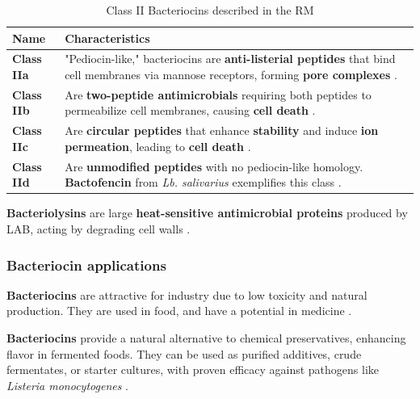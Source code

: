 \begin{table}[h]
    \centering
    \caption{Class II Bacteriocins described in the RM}
    \label{tab:L10-ClassII}
    \begin{tabular}{m{3cm}|p{10cm}} 
        \textbf{Name} & \textbf{Characteristics} \\
        \hline
        \vspace{0.5em}
        \textbf{Class IIa} & "Pediocin-like," bacteriocins are \textbf{anti-listerial peptides} that bind cell membranes via mannose receptors, forming \textbf{pore complexes} \cite*{L10-MicroFunct}. \\

        \vspace{0.5em}
        \textbf{Class IIb} &  Are \textbf{two-peptide antimicrobials} requiring both peptides to permeabilize cell membranes, causing \textbf{cell death} \cite*{L10-MicroFunct}. \\

        \vspace{0.5em}
        \textbf{Class IIc} & Are \textbf{circular peptides} that enhance \textbf{stability} and induce \textbf{ion permeation}, leading to \textbf{cell death} \cite*{L10-MicroFunct}. \\

        \vspace{0.5em}
        \textbf{Class IId} & Are \textbf{unmodified peptides} with no pediocin-like homology. \textbf{Bactofencin} from \textit{Lb. salivarius} exemplifies this class \cite*{L10-MicroFunct}. \\
    \end{tabular}
\end{table}

\textbf{Bacteriolysins} are large \textbf{heat-sensitive antimicrobial proteins} produced by LAB, acting by degrading cell walls \cite*{L10-MicroFunct}.

\subsubsection*{Bacteriocin applications}
\textbf{Bacteriocins} are attractive for industry due to low toxicity and natural production. They are used in food, and have a potential in medicine \cite*{L10-MicroFunct}.

\textbf{Bacteriocins} provide a natural alternative to chemical preservatives, enhancing flavor in fermented foods. They can be used as purified additives, crude fermentates, or starter cultures, with proven efficacy against pathogens like \textit{Listeria monocytogenes} \cite*{L10-MicroFunct}.

